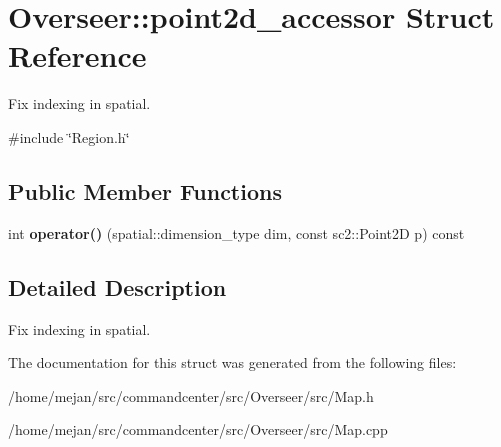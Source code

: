 \hypertarget{structOverseer_1_1point2d__accessor}{}\section{Overseer\+:\+:point2d\+\_\+accessor Struct Reference}
\label{structOverseer_1_1point2d__accessor}


Fix indexing in spatial.  




{\ttfamily \#include \char`\"{}Region.\+h\char`\"{}}

\subsection*{Public Member Functions}
\begin{DoxyCompactItemize}
\item 
int {\bfseries operator()} (spatial\+::dimension\+\_\+type dim, const sc2\+::\+Point2D p) const \hypertarget{structOverseer_1_1point2d__accessor_a739cdd045d2dd5efd6e5788f181ff807}{}\label{structOverseer_1_1point2d__accessor_a739cdd045d2dd5efd6e5788f181ff807}

\end{DoxyCompactItemize}


\subsection{Detailed Description}
Fix indexing in spatial. 

The documentation for this struct was generated from the following files\+:\begin{DoxyCompactItemize}
\item 
/home/mejan/src/commandcenter/src/\+Overseer/src/Map.\+h\item 
/home/mejan/src/commandcenter/src/\+Overseer/src/Map.\+cpp\end{DoxyCompactItemize}
